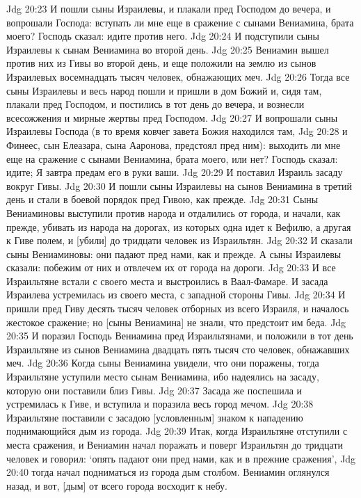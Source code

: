Jdg 20:23  И пошли сыны Израилевы, и плакали пред Господом до вечера, и вопрошали Господа: вступать ли мне еще в сражение с сынами Вениамина, брата моего? Господь сказал: идите против него.
Jdg 20:24  И подступили сыны Израилевы к сынам Вениамина во второй день.
Jdg 20:25  Вениамин вышел против них из Гивы во второй день, и еще положили на землю из сынов Израилевых восемнадцать тысяч человек, обнажающих меч.
Jdg 20:26  Тогда все сыны Израилевы и весь народ пошли и пришли в дом Божий и, сидя там, плакали пред Господом, и постились в тот день до вечера, и вознесли всесожжения и мирные жертвы пред Господом.
Jdg 20:27  И вопрошали сыны Израилевы Господа (в то время ковчег завета Божия находился там,
Jdg 20:28  и Финеес, сын Елеазара, сына Ааронова, предстоял пред ним): выходить ли мне еще на сражение с сынами Вениамина, брата моего, или нет? Господь сказал: идите; Я завтра предам его в руки ваши.
Jdg 20:29  И поставил Израиль засаду вокруг Гивы.
Jdg 20:30  И пошли сыны Израилевы на сынов Вениамина в третий день и стали в боевой порядок пред Гивою, как прежде.
Jdg 20:31  Сыны Вениаминовы выступили против народа и отдалились от города, и начали, как прежде, убивать из народа на дорогах, из которых одна идет к Вефилю, а другая к Гиве полем, и [убили] до тридцати человек из Израильтян.
Jdg 20:32  И сказали сыны Вениаминовы: они падают пред нами, как и прежде. А сыны Израилевы сказали: побежим от них и отвлечем их от города на дороги.
Jdg 20:33  И все Израильтяне встали с своего места и выстроились в Ваал-Фамаре. И засада Израилева устремилась из своего места, с западной стороны Гивы.
Jdg 20:34  И пришли пред Гиву десять тысяч человек отборных из всего Израиля, и началось жестокое сражение; но [сыны Вениамина] не знали, что предстоит им беда.
Jdg 20:35  И поразил Господь Вениамина пред Израильтянами, и положили в тот день Израильтяне из сынов Вениамина двадцать пять тысяч сто человек, обнажавших меч.
Jdg 20:36  Когда сыны Вениамина увидели, что они поражены, тогда Израильтяне уступили место сынам Вениамина, ибо надеялись на засаду, которую они поставили близ Гивы.
Jdg 20:37  Засада же поспешила и устремилась к Гиве, и вступила и поразила весь город мечом.
Jdg 20:38  Израильтяне поставили с засадою [условленным] знаком к нападению поднимающийся дым из города.
Jdg 20:39  Итак, когда Израильтяне отступили с места сражения, и Вениамин начал поражать и поверг Израильтян до тридцати человек и говорил: `опять падают они пред нами, как и в прежние сражения',
Jdg 20:40  тогда начал подниматься из города дым столбом. Вениамин оглянулся назад, и вот, [дым] от всего города восходит к небу.
